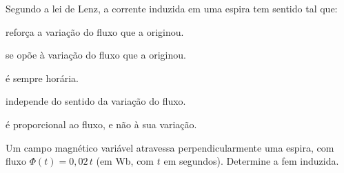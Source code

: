 \blocofixacao
\begin{questao}[1]{}

Segundo a lei de Lenz, a corrente induzida em uma espira tem sentido tal que:
\begin{alternativas}
\item reforça a variação do fluxo que a originou.
\item se opõe à variação do fluxo que a originou.
\item é sempre horária.
\item independe do sentido da variação do fluxo.
\item é proporcional ao fluxo, e não à sua variação.
\end{alternativas}


\end{questao}
\begin{questao}[1]{}

Um campo magnético variável atravessa perpendicularmente uma espira, com fluxo
$\Phi(t) = 0{,}02\,t$ (em Wb, com $t$ em segundos). Determine a fem induzida.


\end{questao}

